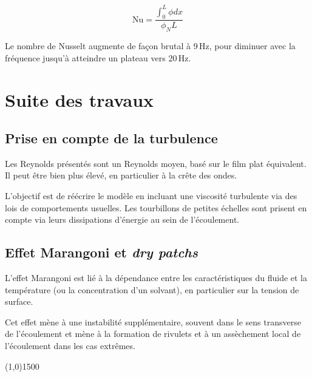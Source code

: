 \documentclass[a0,portrait]{a0poster}
\begin{document}
\begin{multicols}{2}
\begin{multicols}{2}
        $$\mathrm{Nu} = \frac{\int^L_0 \phi dx}{\phi_N L}$$

        Le nombre de Nusselt augmente de façon brutal à 9\,Hz, pour diminuer avec la fréquence jusqu'à atteindre un plateau vers 20\,Hz.

    \end{multicols}

    \section*{Suite des travaux}

    \begin{multicols}{2}
        \subsection*{Prise en compte de la turbulence}
        Les Reynolds présentés sont un Reynolds moyen, basé sur le film plat équivalent. Il peut être bien plus élevé, en particulier à la crête des ondes.

        L'objectif est de réécrire le modèle en incluant une viscosité turbulente via des lois de comportements usuelles. Les tourbillons de petites échelles sont prisent en compte via leurs dissipations d'énergie au sein de l'écoulement.

        \columnbreak

        \subsection*{Effet Marangoni et \emph{dry patchs}}
        L'effet Marangoni est lié à la dépendance entre les caractéristiques du fluide et la température (ou la concentration d'un solvant), en particulier sur la tension de surface.

        Cet effet mène à une instabilité supplémentaire, souvent dans le sens transverse de l'écoulement et mène à la formation de rivulets et à un assèchement local de l'écoulement dans les cas extrêmes.

    \end{multicols}

\end{multicols}

\begin{center}
    \line(1,0){1500}
\end{center}
\end{document}
